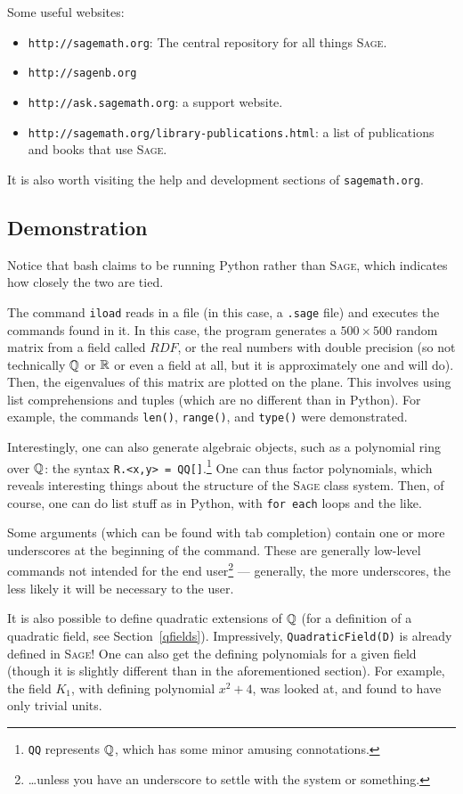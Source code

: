 Some useful websites:
\begin{itemize}
\item \texttt{http://sagemath.org}: The central repository for all things \textsc{Sage}.
\item \texttt{http://sagenb.org}
\item \texttt{http://ask.sagemath.org}: a support website.
\item \texttt{http://sagemath.org/library-publications.html}: a list of publications and books that use \textsc{Sage}.
\end{itemize}
It is also worth visiting the help and development sections of \texttt{sagemath.org}.
\subsection{Demonstration}
Notice that bash claims to be running Python rather than \textsc{Sage}, which indicates how closely the two are tied.

The command \texttt{iload} reads in a file (in this case, a \texttt{.sage} file) and executes the commands found in it. In this case, the program generates a $500\times500$ random matrix from a field called $RDF$, or the real numbers with double precision (so not technically $\mathbb{Q}$ or $\mathbb{R}$ or even a field at all, but it is approximately one and will do). Then, the eigenvalues of this matrix are plotted on the plane. This involves using list comprehensions and tuples (which are no different than in Python). For example, the commands \texttt{len()}, \texttt{range()}, and \texttt{type()} were demonstrated.

Interestingly, one can also generate algebraic objects, such as a polynomial ring over $\mathbb{Q}$: the syntax \texttt{R.<x,y> = QQ[]}.\footnote{\texttt{QQ} represents $\mathbb{Q}$, which has some minor amusing connotations.} One can thus factor polynomials, which reveals interesting things about the structure of the \textsc{Sage} class system. Then, of course, one can do list stuff as in Python, with \texttt{for each} loops and the like.

Some arguments (which can be found with tab completion) contain one or more underscores at the beginning of the command. These are generally low-level commands not intended for the end user\footnote{\dots unless you have an underscore to settle with the system or something.} --- generally, the more underscores, the less likely it will be necessary to the user.

It is also possible to define quadratic extensions of $\mathbb{Q}$ (for a definition of a quadratic field, see Section~\ref{qfields}). Impressively, \texttt{QuadraticField(D)} is already defined in \textsc{Sage}! One can also get the defining polynomials for a given field (though it is slightly different than in the aforementioned section). For example, the field $K_1$, with defining polynomial $x^2+4$, was looked at, and found to have only trivial units.

